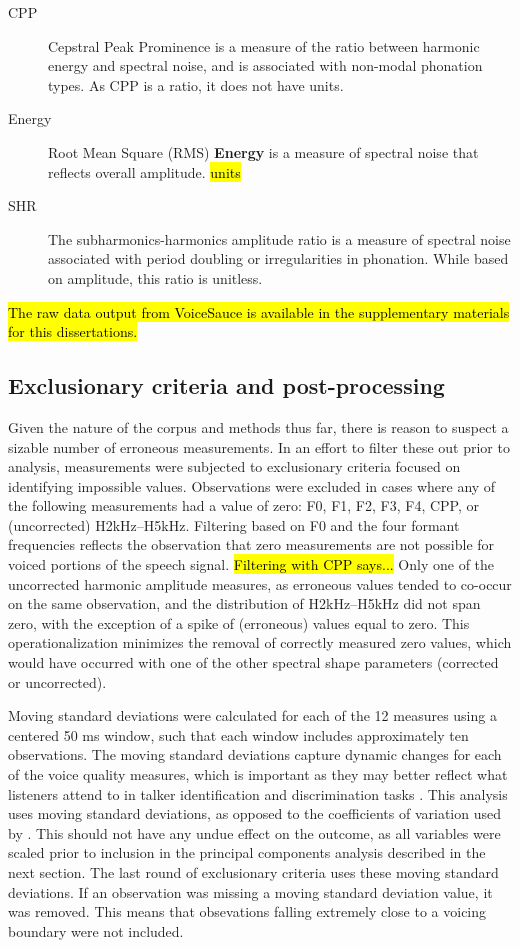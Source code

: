\begin{description}
    \item[CPP] Cepstral Peak Prominence is a measure of the ratio between harmonic energy and spectral noise, and is associated with non-modal phonation types. As CPP is a ratio, it does not have units.
    \item[Energy] Root Mean Square (RMS) \textbf{Energy} is a measure of spectral noise that reflects overall amplitude. \hl{units}
    \item[SHR] The subharmonics-harmonics amplitude ratio is a measure of spectral noise associated with period doubling or irregularities in phonation. While based on amplitude, this ratio is unitless. 
\end{description}

\hl{The raw data output from VoiceSauce is available in the supplementary materials for this dissertations.} %

\subsection{Exclusionary criteria and post-processing}

Given the nature of the corpus and methods thus far, there is reason to suspect a sizable number of erroneous measurements. In an effort to filter these out prior to analysis, measurements were subjected to exclusionary criteria focused on identifying impossible values. Observations were excluded in cases where any of the following measurements had a value of zero: F0, F1, F2, F3, F4, CPP, or (uncorrected) H2kHz--H5kHz. Filtering based on F0 and the four formant frequencies reflects the observation that zero measurements are not possible for voiced portions of the speech signal. \hl{Filtering with CPP says...} Only one of the uncorrected harmonic amplitude measures, as erroneous values tended to co-occur on the same observation, and the distribution of H2kHz--H5kHz did not span zero, with the exception of a spike of (erroneous) values equal to zero. This operationalization minimizes the removal of correctly measured zero values, which would have occurred with one of the other spectral shape parameters (corrected or uncorrected). 

Moving standard deviations were calculated for each of the 12 measures using a centered 50 ms window, such that each window includes approximately ten observations. The moving standard deviations capture dynamic changes for each of the voice quality measures, which is important as they may better reflect what listeners attend to in talker identification and discrimination tasks \citep{lee_2019_acoustic}. This analysis uses moving standard deviations, as opposed to the coefficients of variation used by \citet{lee_2019_acoustic}. This should not have any undue effect on the outcome, as all variables were scaled prior to inclusion in the principal components analysis described in the next section. The last round of exclusionary criteria uses these moving standard deviations. If an observation was missing a moving standard deviation value, it was removed. This means that obsevations falling extremely close to a voicing boundary were not included. 

